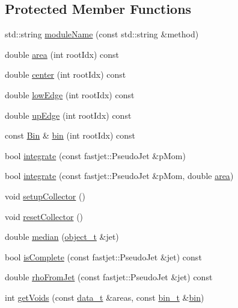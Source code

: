 \subsection*{Protected Member Functions}
\begin{DoxyCompactItemize}
\item 
std\+::string \hyperlink{classSlidingWindow_1_1Window_aa7c8ebbf1c8f8733347cf4b89839ae40}{module\+Name} (const std\+::string \&method)
\item 
double \hyperlink{classSlidingWindow_1_1Window_a76aea1b4663a127bae0fd7a67a0b52b3}{area} (int root\+Idx) const 
\item 
double \hyperlink{classSlidingWindow_1_1Window_a5cedad1cc29cde1eaffcdae9eb6054fa}{center} (int root\+Idx) const 
\item 
double \hyperlink{classSlidingWindow_1_1Window_a4ae79a4961c9116fad3ed61c12ef7a6a}{low\+Edge} (int root\+Idx) const 
\item 
double \hyperlink{classSlidingWindow_1_1Window_a69ff1bc463409ab3254a67a1fb6052e8}{up\+Edge} (int root\+Idx) const 
\item 
const \hyperlink{classSlidingWindow_1_1Bin}{Bin} \& \hyperlink{classSlidingWindow_1_1Window_a3d5b8a5cbd556cccfb783b38b5aad70b}{bin} (int root\+Idx) const 
\item 
bool \hyperlink{classSlidingWindow_1_1Window_a0b5c696522d85d8f98617e1acbc42a34}{integrate} (const fastjet\+::\+Pseudo\+Jet \&p\+Mom)
\item 
bool \hyperlink{classSlidingWindow_1_1Window_ac49709dfb4a0c531153a48908ddd0301}{integrate} (const fastjet\+::\+Pseudo\+Jet \&p\+Mom, double \hyperlink{classSlidingWindow_1_1Window_a76aea1b4663a127bae0fd7a67a0b52b3}{area})
\item 
void \hyperlink{classSlidingWindow_1_1Window_a1abf7b58633a333df3a6f27b2e1e0df2}{setup\+Collector} ()
\item 
void \hyperlink{classSlidingWindow_1_1Window_a6943bd7a73fb6122845c18c956822a58}{reset\+Collector} ()
\item 
double \hyperlink{classSlidingWindow_1_1Window_ade380e81afc10699fbcdd354159f7215}{median} (\hyperlink{classSlidingWindow_1_1Window_a0ee13c18faf2f2ec3855b6449ef765e0}{object\+\_\+t} \&jet)
\item 
bool \hyperlink{classSlidingWindow_1_1Window_afc74b5dbbe5144bc11dedb8980436858}{is\+Complete} (const fastjet\+::\+Pseudo\+Jet \&jet) const 
\item 
double \hyperlink{classSlidingWindow_1_1Window_a0ab685b6c22237c1ef01afe98ce3e0ac}{rho\+From\+Jet} (const fastjet\+::\+Pseudo\+Jet \&jet) const 
\item 
int \hyperlink{classSlidingWindow_1_1Window_a98c3c6acfc89fa989470a195dac46dcb}{get\+Voids} (const \hyperlink{classSlidingWindow_1_1Window_abc07b028eea17a8713e74a556b9d1ad2}{data\+\_\+t} \&areas, const \hyperlink{classSlidingWindow_1_1Window_a9bbfc142a52e17a3e1c51093edfe936f}{bin\+\_\+t} \&\hyperlink{classSlidingWindow_1_1Window_a3d5b8a5cbd556cccfb783b38b5aad70b}{bin})
\end{DoxyCompactItemize}
